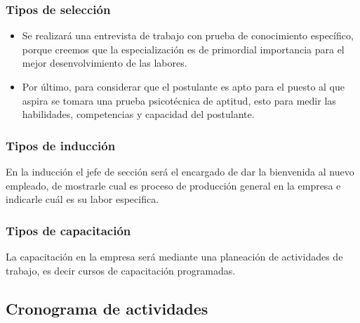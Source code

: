 \documentclass[
  stu,
  floatsintext,
  longtable,
  a4paper,
  nolmodern,
  notxfonts,
  notimes,
  colorlinks=true,linkcolor=blue,citecolor=blue,urlcolor=blue]{apa7}
\providecommand{\tightlist}{%
  \setlength{\itemsep}{0pt}\setlength{\parskip}{0pt}}
\begin{document}
\subsubsection{Tipos de selección}\label{tipos-de-selecciuxf3n}

\begin{itemize}
\tightlist
\item
  \hspace{0pt} Se realizará una entrevista de trabajo con prueba de
  conocimiento específico, porque creemos que la especialización es de
  primordial importancia para el mejor desenvolvimiento de las labores.
\item
  \hspace{0pt} Por último, para considerar que el postulante es apto
  para el puesto al que aspira se tomara una prueba psicotécnica de
  aptitud, esto para medir las habilidades, competencias y capacidad del
  postulante.
\end{itemize}

\subsubsection{Tipos de inducción}\label{tipos-de-inducciuxf3n}

En la inducción el jefe de sección será el encargado de dar la
bienvenida al nuevo empleado, de mostrarle cual es proceso de producción
general en la empresa e indicarle cuál es su labor especifica.

\subsubsection{Tipos de capacitación}\label{tipos-de-capacitaciuxf3n}

La capacitación en la empresa será mediante una planeación de
actividades de trabajo, es decir cursos de capacitación programadas.

\subsection{Cronograma de actividades}\label{cronograma-de-actividades}
\end{document}
